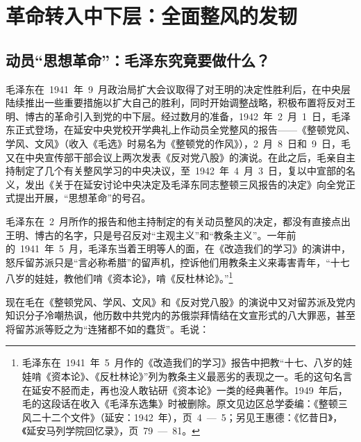 
\chapter{革命转入中下层：全面整风的发韧}

\section{动员“思想革命”：毛泽东究竟要做什么？}

毛泽东在~1941~年~9~月政治局扩大会议取得了对王明的决定性胜利后，在中央层陆续推出一些重要措施以扩大自己的胜利，同时开始调整战略，积极布置将反对王明、博古的革命引入到党的中下层。经过数月的准备，1942~年~2~月~1~日，毛泽东正式登场，在延安中央党校开学典礼上作动员全党整风的报告——《整顿党风、学风、文风》（收入《毛选》时易名为《整顿党的作风》），2~月~8~日和~9~日，毛又在中央宣传部干部会议上两次发表《反对党八股》的演说。在此之后，毛亲自主持制定了几个有关整风学习的中央决议，至~1942~年~4~月~3~日，复以中宣部的名义，发出《关于在延安讨论中央决定及毛泽东同志整顿三风报告的决定》向全党正式提出开展，“思想革命”的号召。

毛泽东在~2~月所作的报告和他主持制定的有关动员整风的决定，都没有直接点出王明、博古的名字，只是号召反对“主观主义”和“教条主义”。一年前的~1941~年~5~月，毛泽东当着王明等人的面，在《改造我们的学习》的演讲中，怒斥留苏派只是“言必称希腊”的留声机，控诉他们用教条主义来毒害青年，“十七八岁的娃娃，教他们啃《资本论》，啃《反杜林论》。”\footnote{毛泽东在~1941~年~5~月作的《改造我们的学习》报告中把教“十七、八岁的娃娃啃《资本论》、《反杜林论》”列为教条主义最恶劣的表现之一。毛的这句名言在延安不胫而走，再也没人敢钻研《资本论》一类的经典著作。1949~年后，毛的这段话在收入《毛泽东选集》时被删除。原文见边区总学委编：《整顿三风二十二个文件》（延安：1942~年），页~4~—~5；另见王惠德：《忆昔日》，《延安马列学院回忆录》，页~79~—~81。}

现在毛在《整顿党风、学风、文风》和《反对党八股》的演说中又对留苏派及党内知识分子冷嘲热讽，他历数中共党内的苏俄崇拜情结在文宣形式的八大罪恶，甚至将留苏派等贬之为“连猪都不如的蠢货”。毛说：

